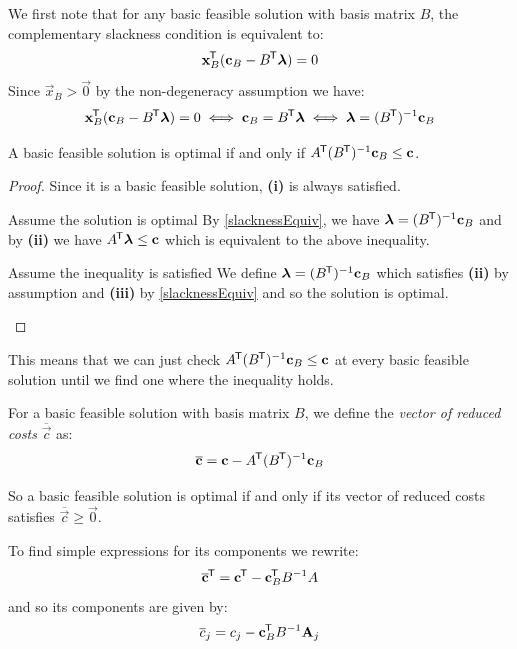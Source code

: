 \documentclass[../main.tex]{subfiles}
\begin{document}
We first note that for any basic feasible solution with basis matrix $B$, the complementary slackness condition is equivalent to:
\[
  \mathbf{\bm{x}}_{B}^{{\mkern-1.5mu\mathsf{T}}}(\mathbf{\bm{c}}_{B} - B^{{\mkern-1.5mu\mathsf{T}}} \mathbf{\bm{\lambda}}) = 0
\]
Since $\vec{x}_{B} > \vec{0}$ by the non-degeneracy assumption we have:
\begin{equation}
  \mathbf{\bm{x}}_{B}^{{\mkern-1.5mu\mathsf{T}}}(\mathbf{\bm{c}}_{B} - B^{{\mkern-1.5mu\mathsf{T}}} \mathbf{\bm{\lambda}}) = 0 \iff \mathbf{\bm{c}}_B = B^{{\mkern-1.5mu\mathsf{T}}} \mathbf{\bm{\lambda}} \iff \mathbf{\bm{\lambda}} = (B^{{\mkern-1.5mu\mathsf{T}}})^{-1} \mathbf{\bm{c}}_B \label{slacknessEquiv}
\end{equation}
\begin{corollary}
  A basic feasible solution is optimal if and only if $A^{{\mkern-1.5mu\mathsf{T}}} (B^{{\mkern-1.5mu\mathsf{T}}})^{-1} \mathbf{\bm{c}}_B \leq \mathbf{\bm{c}}$. \label{BFSCond}
\end{corollary}
\begin{proof}
  Since it is a basic feasible solution, \textbf{(i)} is always satisfied.
  \begin{proofdirection}{Assume the solution is optimal}
    By \cref{slacknessEquiv}, we have $\mathbf{\bm{\lambda}} = (B^{{\mkern-1.5mu\mathsf{T}}})^{-1} \mathbf{\bm{c}}_B$ and by \textbf{(ii)} we have $A^{{\mkern-1.5mu\mathsf{T}}} \mathbf{\bm{\lambda}} \leq \mathbf{\bm{c}}$ which is equivalent to the above inequality.
  \end{proofdirection}
  \begin{proofdirection}{Assume the inequality is satisfied}
    We define $\mathbf{\bm{\lambda}} = (B^{{\mkern-1.5mu\mathsf{T}}})^{-1} \mathbf{\bm{c}}_B$ which satisfies \textbf{(ii)} by assumption and \textbf{(iii)} by \cref{slacknessEquiv} and so the solution is optimal.
  \end{proofdirection}
\end{proof}
This means that we can just check $A^{{\mkern-1.5mu\mathsf{T}}}(B^{{\mkern-1.5mu\mathsf{T}}})^{-1}\mathbf{\bm{c}}_{B} \leq \mathbf{\bm{c}}$ at every basic feasible solution until we find one where the inequality holds.
\begin{definition}
  For a basic feasible solution with basis matrix $B$, we define the \textit{vector of reduced costs} $\overline{\vec{c}}$ as:
  \[
    \overline{\mathbf{\bm{c}}} = \mathbf{\bm{c}} - A^{{\mkern-1.5mu\mathsf{T}}} (B^{{\mkern-1.5mu\mathsf{T}}})^{-1} \mathbf{\bm{c}}_B
  \]
\end{definition}
So a basic feasible solution is optimal if and only if its vector of reduced costs satisfies $\overline{\vec{c}} \geq \vec{0}$.

To find simple expressions for its components we rewrite:
\[
  \overline{\mathbf{\bm{c}}}^{{\mkern-1.5mu\mathsf{T}}} = \mathbf{\bm{c}}^{{\mkern-1.5mu\mathsf{T}}} - \mathbf{\bm{c}}^{{\mkern-1.5mu\mathsf{T}}}_B B^{-1} A
\]
and so its components are given by:
\begin{equation}
  \overline{c}_j = c_j - \mathbf{\bm{c}}^{{\mkern-1.5mu\mathsf{T}}}_{B} B^{-1} \mathbf{\bm{A}}_j \label{reducedCostComponents}
\end{equation}
\end{document}
